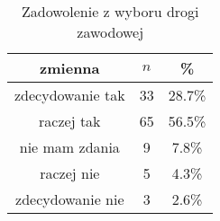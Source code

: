 \begin{table}[H]
\caption{Zadowolenie z wyboru drogi zawodowej}
\centering
\begin{tabular}{ | c | c | c |}
\hline
zmienna & $n$ & \% \\
\hline
zdecydowanie tak  &  33  & 28.7\% \\
\hline
raczej tak  &  65  & 56.5\% \\
\hline
nie mam zdania  &  9  & 7.8\% \\
\hline
raczej nie  &  5  & 4.3\% \\
\hline
zdecydowanie nie  &  3  & 2.6\% \\
\hline
\end{tabular}
\label{tab:Q5}
\end{table}

